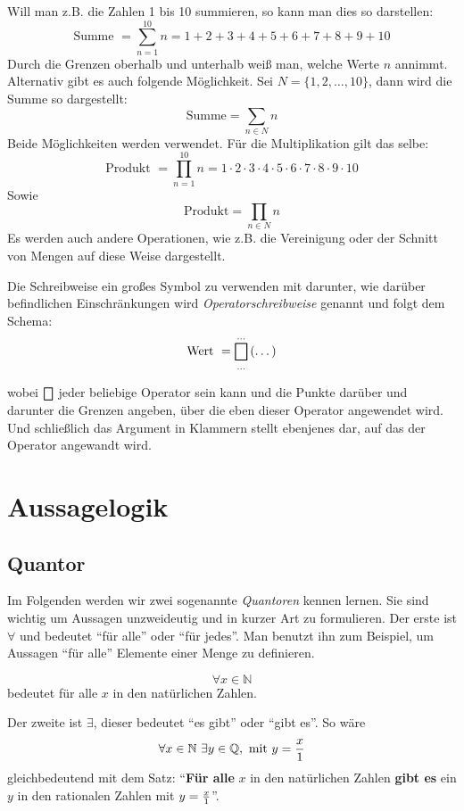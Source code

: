 Will man z.B. die Zahlen 1 bis 10 summieren, so kann man dies so darstellen:
\[ \text{Summe } = \sum_{n=1}^{10} n = 1+2+3+4+5+6+7+8+9+10 \]
Durch die Grenzen oberhalb und unterhalb weiß man, welche Werte $n$ annimmt. Alternativ gibt es auch folgende Möglichkeit. Sei $N = \{ 1,2, \dots ,10 \}$, dann wird die Summe so dargestellt:
\[ \text{Summe} = \sum_{n\in N} n \]
Beide Möglichkeiten werden verwendet. 
Für die Multiplikation gilt das selbe:
\[ \text{Produkt } = \prod_{n=1}^{10} n = 1\cdot 2\cdot 3\cdot 4\cdot 5\cdot 6\cdot 7\cdot 8\cdot 9\cdot 10 \]
Sowie
\[ \text{Produkt} = \prod_{n\in N} n  \]
Es werden auch andere Operationen, wie z.B. die Vereinigung oder der Schnitt von Mengen auf diese Weise dargestellt. 
\begin{definition}
Die Schreibweise ein großes Symbol zu verwenden mit darunter, wie darüber befindlichen Einschränkungen wird \textsl{Operatorschreibweise} genannt und folgt dem Schema:
 \[ \text{Wert } = \bigbox_{\dots}^{\dots}\left( \dots \right) \]
\end{definition}
wobei $\bigbox$ jeder beliebige Operator sein kann und die Punkte darüber und darunter die Grenzen angeben, über die eben dieser Operator angewendet wird. Und schließlich das Argument in Klammern stellt ebenjenes dar, auf das der Operator angewandt wird. 

\section{Aussagelogik}

\subsection{Quantor}

Im Folgenden werden wir zwei sogenannte \textsl{Quantoren}  kennen lernen. Sie sind wichtig um Aussagen unzweideutig und in kurzer Art zu formulieren. Der erste ist $\forall$ und bedeutet "`für alle"' oder "`für jedes"'. Man benutzt ihn zum Beispiel, um Aussagen "`für alle"' Elemente einer Menge zu definieren.

\[ \forall x\in \mathbb{N} \]
bedeutet für alle $x$ in den natürlichen Zahlen.

Der zweite ist $\exists$, dieser bedeutet "`es gibt"'  oder "`gibt es"'. So wäre 
\[ \forall x\in \mathbb{N}\ \exists y\in \mathbb{Q},\text{ mit }  y={x\over 1} \]
gleichbedeutend mit dem Satz: "`\textbf{Für alle} $x$ in den natürlichen Zahlen \textbf{gibt es} ein $y$ in den rationalen Zahlen mit $y={x \over 1}$"'.

